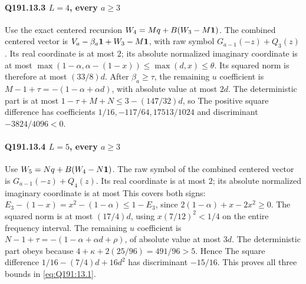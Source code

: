 \paragraph{Q191.13.3 $L=\allowbreak 4$, every $a\ge\allowbreak 3$}
Use the exact centered recursion $W_4=\allowbreak Mq+B(W_3-M\mathbf1)$.
The combined centered vector is $V_a-\beta_a\mathbf1+W_3-M\mathbf1$,
with raw symbol $G_{a-1}(-z)+Q_3(z)$. Its real coordinate is at most
$2$; its absolute normalized imaginary coordinate is at most
$\max(1-\alpha,\allowbreak \alpha-(1-x))\le\allowbreak \max(d,\allowbreak x)\le\allowbreak \theta$.
Its squared norm is therefore at most $(33/8)d$.
After $\beta_a\ge\allowbreak \tau$, the remaining $u$ coefficient is
$M-1+\tau=\allowbreak -(1-\alpha+\alpha d)$, with absolute value at most $2d$.
The deterministic part is at most $1-\tau+M+N\le\allowbreak 3-(147/32)d$, so
The positive square difference has coefficients
$1/16,\allowbreak -117/64,\allowbreak 17513/1024$ and discriminant $-3824/4096<\allowbreak 0$.

\paragraph{Q191.13.4 $L=\allowbreak 5$, every $a\ge\allowbreak 3$}
Use $W_5=\allowbreak Nq+B(W_4-N\mathbf1)$. The raw symbol of the combined centered
vector is $G_{a-1}(-z)+Q_4(z)$. Its real coordinate is at most $2$;
its absolute normalized imaginary coordinate is at most
This covers both signs: $E_3-(1-x)=\allowbreak x^2-(1-\alpha)\le\allowbreak 1-E_3$, since
$2(1-\alpha)+x-2x^2\ge\allowbreak 0$. The squared norm is at most $(17/4)d$,
using $x(7/12)^2<\allowbreak 1/4$ on the entire frequency interval.
The remaining $u$ coefficient is
$N-1+\tau=\allowbreak -(1-\alpha+\alpha d+\rho)$, of absolute value at most $3d$.
The deterministic part obeys
because $4+\kappa+2(25/96)=\allowbreak 491/96>\allowbreak 5$. Hence
The square difference $1/16-(7/4)d+16d^2$ has discriminant $-15/16$.
This proves all three bounds in \eqref{eq:Q191:13.1}.

